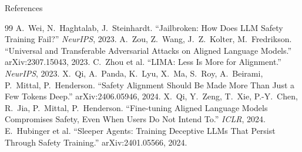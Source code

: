 \documentclass[aspectratio=169,11pt]{beamer}
\begin{document}
\begin{frame}[allowframebreaks]{References}
\begin{thebibliography}{99}
     A.~Wei, N.~Haghtalab, J.~Steinhardt. ``Jailbroken: How Does LLM Safety Training Fail?'' \emph{NeurIPS}, 2023.
     A.~Zou, Z.~Wang, J.~Z.~Kolter, M.~Fredrikson. ``Universal and Transferable Adversarial Attacks on Aligned Language Models.'' arXiv:2307.15043, 2023.
     C.~Zhou et al. ``LIMA: Less Is More for Alignment.'' \emph{NeurIPS}, 2023.
     X.~Qi, A.~Panda, K.~Lyu, X.~Ma, S.~Roy, A.~Beirami, P.~Mittal, P.~Henderson. ``Safety Alignment Should Be Made More Than Just a Few Tokens Deep.'' arXiv:2406.05946, 2024.
     X.~Qi, Y.~Zeng, T.~Xie, P.-Y.~Chen, R.~Jia, P.~Mittal, P.~Henderson. ``Fine-tuning Aligned Language Models Compromises Safety, Even When Users Do Not Intend To.'' \emph{ICLR}, 2024.
     E.~Hubinger et al. ``Sleeper Agents: Training Deceptive LLMs That Persist Through Safety Training.'' arXiv:2401.05566, 2024.
  \end{thebibliography}
\end{frame}
\end{document}
